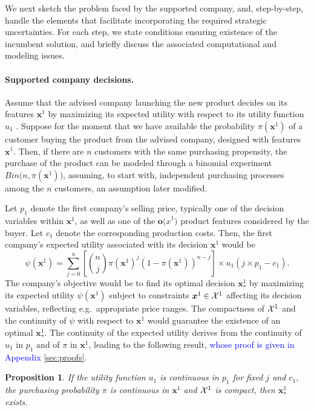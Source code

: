 \documentclass[a4paper,fleqn, 11pt]{cas-sc}
\newtheorem{proposition}{Proposition}
\begin{document}
  We next sketch the problem faced by the supported company, and, step-by-step, handle the elements that facilitate incorporating the required strategic uncertainties. For each step, we state conditions ensuring existence of the incumbent solution, and  briefly discuss the associated
  computational and modeling issues.


\paragraph{{\bf Supported company decisions.}}  
  Assume that the advised company launching the new product decides on its features ${\bm x}^1$ by maximizing
  its expected utility with respect to its utility function $u_1$ \citep{french}. Suppose for the moment  that we 
    have available the probability $\pi({\bm x}^1)$ of a customer buying the product 
    from the advised company, designed with features ${\bm x}^1$.  Then, if there are  $n$ customers with the same
  purchasing propensity, the purchase of the product can be modeled 
     through a binomial experiment $Bin \big(n, \pi({\bm x}^1) \big)$, assuming, to start with, independent purchasing processes among the $n$ customers, an  assumption later modified.

Let $p_1$ denote the first company's selling price,   
 typically one of the decision variables
 within ${\bm x}^1$, as well as one of the ${\bm o(x}^1)$ product features considered by the buyer. Let $c_1$ 
denote the corresponding production costs. Then, the 
  first company's expected utility associated with its 
  decision ${\bm x}^1$ would be   
\begin{equation}\label{kkbarna}
    \psi({\bm x}^1) = \sum_{j=0}^n 
    \left[ \binom{n}{j} \pi({\bm x}^1)^j (1 - \pi({\bm x}^1))^{n-j} \right] \times u_1 (j \times p_1 - c_1).
\end{equation}
  The company's objective would be to find its optimal decision ${\bm x}^{1}_*$ by maximizing its expected utility $\psi({\bm x}^1)$ subject to constraints ${\bm x}^1\in {\cal  X}^1$ affecting its decision variables, reflecting e.g.\ appropriate price ranges. 
 The compactness  of $ {\cal  X}^1$  and the continuity of $\psi $ with respect to ${\bm x}^1$ would guarantee the existence of an optimal ${\bm x}^{1}_*$. The continuity of the expected utility derives from the continuity of $u_1$ in $p_1$ and of $\pi$ in ${\bm x}^1$, leading to the following result, \textcolor{blue}{whose proof is given in Appendix \ref{sec:proofs}}.
  \begin{proposition}
\label{lemma_1}
If the utility function $u_1$ is continuous in $p_1$ for fixed $j$ and $c_1$, 
the purchasing probability $\pi$ is continuous in ${\bm x}^1$ and 
${\cal X}^1$ is compact, then ${\bm x}_*^1$ exists.
\end{proposition}
\end{document}
